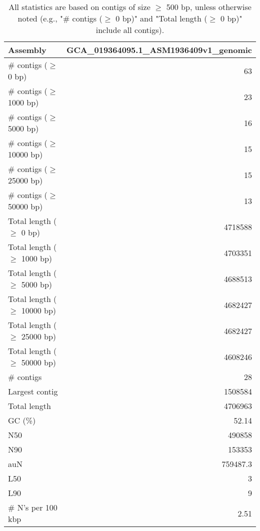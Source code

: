 \documentclass[12pt,a4paper]{article}
\begin{document}
\begin{table}[ht]
\begin{center}
\caption{All statistics are based on contigs of size $\geq$ 500 bp, unless otherwise noted (e.g., "\# contigs ($\geq$ 0 bp)" and "Total length ($\geq$ 0 bp)" include all contigs).}
\begin{tabular}{|l*{1}{|r}|}
\hline
Assembly & GCA\_019364095.1\_ASM1936409v1\_genomic \\ \hline
\# contigs ($\geq$ 0 bp) & 63 \\ \hline
\# contigs ($\geq$ 1000 bp) & 23 \\ \hline
\# contigs ($\geq$ 5000 bp) & 16 \\ \hline
\# contigs ($\geq$ 10000 bp) & 15 \\ \hline
\# contigs ($\geq$ 25000 bp) & 15 \\ \hline
\# contigs ($\geq$ 50000 bp) & 13 \\ \hline
Total length ($\geq$ 0 bp) & 4718588 \\ \hline
Total length ($\geq$ 1000 bp) & 4703351 \\ \hline
Total length ($\geq$ 5000 bp) & 4688513 \\ \hline
Total length ($\geq$ 10000 bp) & 4682427 \\ \hline
Total length ($\geq$ 25000 bp) & 4682427 \\ \hline
Total length ($\geq$ 50000 bp) & 4608246 \\ \hline
\# contigs & 28 \\ \hline
Largest contig & 1508584 \\ \hline
Total length & 4706963 \\ \hline
GC (\%) & 52.14 \\ \hline
N50 & 490858 \\ \hline
N90 & 153353 \\ \hline
auN & 759487.3 \\ \hline
L50 & 3 \\ \hline
L90 & 9 \\ \hline
\# N's per 100 kbp & 2.51 \\ \hline
\end{tabular}
\end{center}
\end{table}
\end{document}

